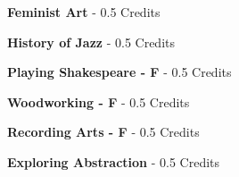 \vspace{3mm}
\noindent\textbf{Feminist Art}  - 0.5 Credits

\vspace{3mm}
\noindent\textbf{History of Jazz}  - 0.5 Credits

\vspace{3mm}
\noindent\textbf{Playing Shakespeare - F}  - 0.5 Credits

\vspace{3mm}
\noindent\textbf{Woodworking - F}  - 0.5 Credits

\vspace{3mm}
\noindent\textbf{Recording Arts - F}  - 0.5 Credits

\vspace{3mm}
\noindent\textbf{Exploring Abstraction}  - 0.5 Credits

\vspace{3mm}
